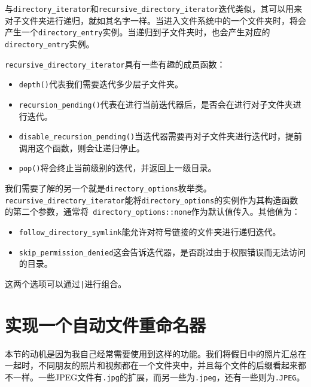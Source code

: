与\texttt{directory\_iterator}和\texttt{recursive\_directory\_iterator}迭代类似，其可以用来对子文件夹进行递归，就如其名字一样。当进入文件系统中的一个文件夹时，将会产生一个\texttt{directory\_entry}实例。当递归到子文件夹时，也会产生对应的\texttt{directory\_entry}实例。

\texttt{recursive\_directory\_iterator}具有一些有趣的成员函数：

\begin{itemize}
\item \texttt{depth()}代表我们需要迭代多少层子文件夹。

\item \texttt{recursion\_pending()}代表在进行当前迭代器后，是否会在进行对子文件夹进行迭代。

\item \texttt{disable\_recursion\_pending()}当迭代器需要再对子文件夹进行迭代时，提前调用这个函数，则会让递归停止。

\item \texttt{pop()}将会终止当前级别的迭代，并返回上一级目录。

\end{itemize}


我们需要了解的另一个就是\texttt{directory\_options}枚举类。\texttt{recursive\_directory\_iterator}能将\texttt{directory\_options}的实例作为其构造函数的第二个参数，通常将\texttt{ directory\_options::none}作为默认值传入。其他值为：

\begin{itemize}
\item \texttt{follow\_directory\_symlink}能允许对符号链接的文件夹进行递归迭代。

\item \texttt{skip\_permission\_denied}这会告诉迭代器，是否跳过由于权限错误而无法访问的目录。

\end{itemize}

这两个选项可以通过\texttt{|}进行组合。


\section{实现一个自动文件重命名器}

本节的动机是因为我自己经常需要使用到这样的功能。我们将假日中的照片汇总在一起时，不同朋友的照片和视频都在一个文件夹中，并且每个文件的后缀看起来都不一样。一些JPEG文件有\texttt{.jpg}的扩展，而另一些为\texttt{.jpeg}，还有一些则为\texttt{.JPEG}。

